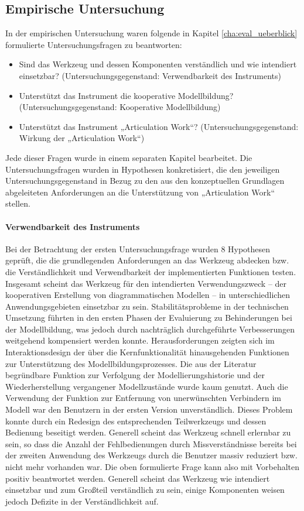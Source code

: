 \subsection{Empirische Untersuchung}

In der empirischen Untersuchung waren folgende in Kapitel \ref{cha:eval_ueberblick} formulierte Untersuchungsfragen zu beantworten:

\begin{itemize}
 \item Sind das Werkzeug und dessen Komponenten verständlich und wie intendiert einsetzbar? (Untersuchungsgegenstand: Verwendbarkeit des Instruments)
 \item Unterstützt das Instrument die kooperative Modellbildung? (Untersuchungsgegenstand: Kooperative Modellbildung)
 \item Unterstützt das Instrument „Articulation Work“? (Untersuchungsgegenstand: Wirkung der „Articulation Work“)
\end{itemize}

Jede dieser Fragen wurde in einem separaten Kapitel bearbeitet. Die Untersuchungsfragen wurden in Hypothesen konkretisiert, die den jeweiligen Untersuchungsgegenstand in Bezug zu den aus den konzeptuellen Grundlagen abgeleiteten Anforderungen an die Unterstützung von „Articulation Work“ stellen.

\paragraph{Verwendbarkeit des Instruments} %
Bei der Betrachtung der ersten Untersuchungsfrage wurden 8 Hypothesen geprüft, die die grundlegenden Anforderungen an das Werkzeug abdecken bzw. die Verständlichkeit und Verwendbarkeit der implementierten Funktionen testen. Insgesamt scheint das Werkzeug für den intendierten Verwendungszweck -- der kooperativen Erstellung von diagrammatischen Modellen -- in unterschiedlichen Anwendungsgebieten einsetzbar zu sein. Stabilitätsprobleme in der technischen Umsetzung führten in den ersten Phasen der Evaluierung zu Behinderungen bei der Modellbildung, was jedoch durch nachträglich durchgeführte Verbesserungen weitgehend kompensiert werden konnte. Herausforderungen zeigten sich im Interaktionsdesign der über die Kernfunktionalität hinausgehenden Funktionen zur Unterstützung des Modellbildungsprozesses. Die aus der Literatur begründbare Funktion zur Verfolgung der Modellierungshistorie und der Wiederherstellung vergangener Modellzustände wurde kaum genutzt. Auch die Verwendung der Funktion zur Entfernung von unerwünschten Verbindern im Modell war den Benutzern in der ersten Version unverständlich. Dieses Problem konnte durch ein Redesign des entsprechenden Teilwerkzeugs und dessen Bedienung beseitigt werden. Generell scheint das Werkzeug schnell erlernbar zu sein, so dass die Anzahl der Fehlbedienungen durch Missverständnisse bereits bei der zweiten Anwendung des Werkzeugs durch die Benutzer massiv reduziert bzw. nicht mehr vorhanden war. Die oben formulierte Frage kann also mit Vorbehalten positiv beantwortet werden. Generell scheint das Werkzeug wie intendiert einsetzbar und zum Großteil verständlich zu sein, einige Komponenten weisen jedoch Defizite in der Verständlichkeit auf.

